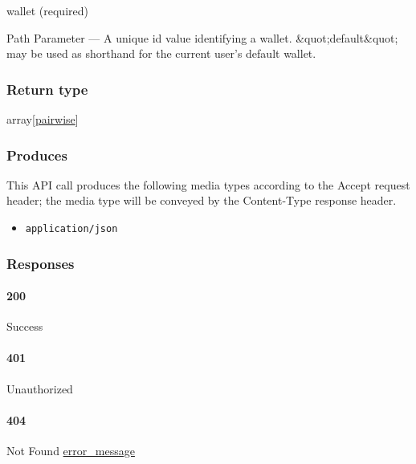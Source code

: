 wallet (required)

{Path Parameter} --- A unique id value identifying a wallet.
\&quot;default\&quot; may be used as shorthand for the current user's
default wallet.

\hypertarget{return-type-141}{%
\subsubsection{Return type}\label{return-type-141}}

array{[}\protect\hyperlink{pairwise}{pairwise}{]}

\hypertarget{produces-179}{%
\subsubsection{Produces}\label{produces-179}}

This API call produces the following media types according to the
{Accept} request header; the media type will be conveyed by the
{Content-Type} response header.

\begin{itemize}
\tightlist
\item
  \texttt{application/json}
\end{itemize}

\hypertarget{responses-185}{%
\subsubsection{Responses}\label{responses-185}}

\hypertarget{section-596}{%
\paragraph{200}\label{section-596}}

Success

\hypertarget{section-597}{%
\paragraph{401}\label{section-597}}

Unauthorized \protect\hyperlink{}{}

\hypertarget{section-598}{%
\paragraph{404}\label{section-598}}

Not Found \protect\hyperlink{error_message}{error\_message}

